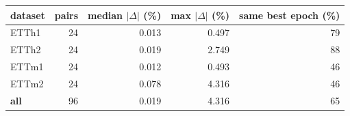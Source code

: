 \begin{tabular}{lrrrr}
\toprule
dataset & pairs & median $|\Delta|$ (\%) & max $|\Delta|$ (\%) & same best epoch (\%) \\
\midrule
ETTh1 & 24 & 0.013 & 0.497 & 79 \\
ETTh2 & 24 & 0.019 & 2.749 & 88 \\
ETTm1 & 24 & 0.012 & 0.493 & 46 \\
ETTm2 & 24 & 0.078 & 4.316 & 46 \\
\textbf{all} & 96 & 0.019 & 4.316 & 65 \\
\bottomrule
\end{tabular}